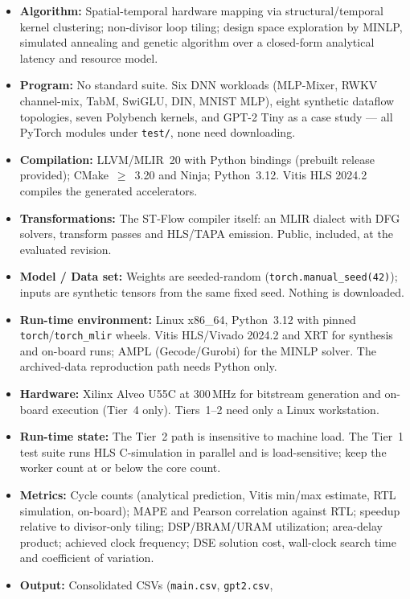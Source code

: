 {\small
\begin{itemize}
  \item {\bf Algorithm: } Spatial-temporal hardware mapping via structural/temporal
    kernel clustering; non-divisor loop tiling; design space exploration by MINLP,
    simulated annealing and genetic algorithm over a closed-form analytical latency and
    resource model.
  \item {\bf Program: } No standard suite. Six DNN workloads (MLP-Mixer, RWKV
    channel-mix, TabM, SwiGLU, DIN, MNIST MLP), eight synthetic dataflow topologies,
    seven Polybench kernels, and GPT-2 Tiny as a case study --- all PyTorch modules
    under \texttt{test/}, none need downloading.
  \item {\bf Compilation: } LLVM/MLIR~20 with Python bindings (prebuilt release
    provided); CMake~$\geq$~3.20 and Ninja; Python~3.12. Vitis HLS 2024.2 compiles the
    generated accelerators.
  \item {\bf Transformations: } The ST-Flow compiler itself: an MLIR dialect with DFG
    solvers, transform passes and HLS/TAPA emission. Public, included, at the
    evaluated revision.
  \item {\bf Model / Data set: } Weights are seeded-random
    (\texttt{torch.manual\_seed(42)}); inputs are synthetic tensors from the same
    fixed seed. Nothing is downloaded.
  \item {\bf Run-time environment: } Linux x86\_64, Python~3.12 with pinned
    \texttt{torch}/\texttt{torch\_mlir} wheels. Vitis HLS/Vivado 2024.2 and XRT for
    synthesis and on-board runs; AMPL (Gecode/Gurobi) for the MINLP solver. The
    archived-data reproduction path needs Python only.
  \item {\bf Hardware: } Xilinx Alveo U55C at 300\,MHz for bitstream generation and
    on-board execution (Tier~4 only). Tiers~1--2 need only a Linux workstation.
  \item {\bf Run-time state: } The Tier~2 path is insensitive to machine load. The
    Tier~1 test suite runs HLS C-simulation in parallel and is load-sensitive; keep the
    worker count at or below the core count.
  \item {\bf Metrics: } Cycle counts (analytical prediction, Vitis min/max estimate,
    RTL simulation, on-board); MAPE and Pearson correlation against RTL; speedup
    relative to divisor-only tiling; DSP/BRAM/URAM utilization; area-delay product;
    achieved clock frequency; DSE solution cost, wall-clock search time and
    coefficient of variation.
  \item {\bf Output: } Consolidated CSVs (\texttt{main.csv}, \texttt{gpt2.csv},

\end{itemize}}
